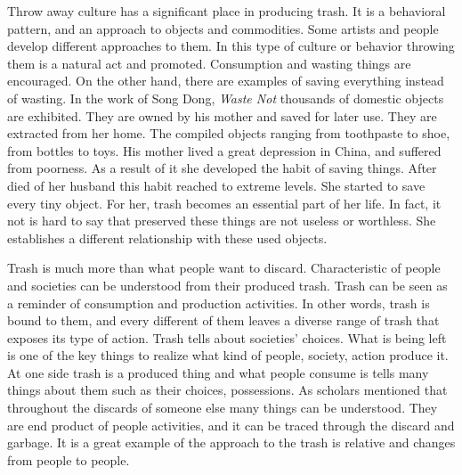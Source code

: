 Throw away culture has a significant place in producing trash. It is a behavioral pattern, and an approach to objects and commodities. Some artists and people develop different approaches to them. In this type of culture or behavior throwing them is a natural act and promoted. Consumption and wasting things are encouraged. On the other hand, there are examples of saving everything instead of wasting. In the work of Song Dong, \textit{Waste Not} thousands of domestic objects are exhibited. They are owned by his mother and saved for later use. They are extracted from her home. The compiled objects ranging from toothpaste to shoe, from bottles to toys. His mother lived a great depression in China, and suffered from poorness. As a result of it she developed the habit of saving things. After died of her husband this habit reached to extreme levels. She started to save every tiny object. For her, trash becomes an essential part of her life. In fact, it not is hard to say that preserved these things are not useless or worthless. She establishes a different relationship with these used objects.

Trash is much more than what people want to discard. Characteristic of people and societies can be understood from their produced trash. Trash can be seen as a reminder of consumption and production activities. In other words, trash is bound to them, and every different of them leaves a diverse range of trash that exposes its type of action. Trash tells about societies’ choices. What is being left is one of the key things to realize what kind of people, society, action produce it. At one side trash is a produced thing and what people consume is tells many things about them such as their choices, possessions. As scholars mentioned that throughout the discards of someone else many things can be understood. They are end product of people activities, and it can be traced through the discard and garbage. It is a great example of the approach to the trash is relative and changes from people to people.


